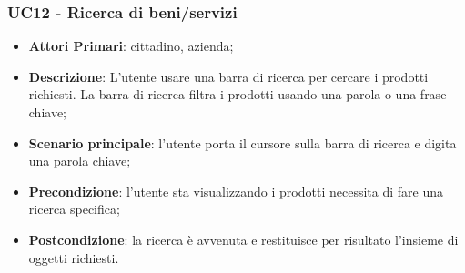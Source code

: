  \subsubsection{UC12 - Ricerca di beni/servizi}
\begin{itemize}
	\item \textbf{Attori Primari}: cittadino, azienda;
	\item \textbf{Descrizione}: L'utente usare una barra di ricerca per cercare i prodotti richiesti. La barra di ricerca filtra i prodotti usando una parola o una frase chiave;
	\item \textbf{Scenario principale}: l'utente porta il cursore sulla barra di ricerca e digita una parola chiave;
	\item \textbf{Precondizione}: l'utente sta visualizzando i prodotti necessita di fare una ricerca specifica;
	\item \textbf{Postcondizione}: la ricerca è avvenuta e restituisce per risultato l'insieme di oggetti richiesti.
\end{itemize}